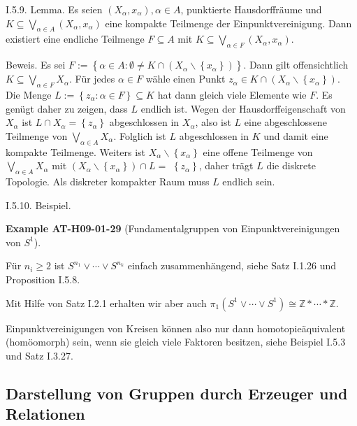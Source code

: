 \documentclass[10pt, letterpaper]{article}
\newcommand{\CustomHeading}[3]{%
  \par\medskip\noindent%
  \textbf{#1 #2} \textnormal{(#3)}.\enskip%
}
\newenvironment{EXA}[2]{\begin{unitbox}\CustomHeading{Example}{#1}{#2}}{\end{unitbox}}
\begin{document}
I.5.9. Lemma. Es seien $\left(X_\alpha, x_\alpha\right), \alpha \in A$, punktierte Hausdorffräume und $K \subseteq \bigvee_{\alpha \in A}\left(X_\alpha, x_\alpha\right)$ eine kompakte Teilmenge der Einpunktvereinigung. Dann existiert eine endliche Teilmenge $F \subseteq A$ mit $K \subseteq \bigvee_{\alpha \in F}\left(X_\alpha, x_\alpha\right)$.

Beweis. Es sei $F:=\left\{\alpha \in A: \emptyset \neq K \cap\left(X_\alpha \backslash\left\{x_\alpha\right\}\right)\right\}$. Dann gilt offensichtlich $K \subseteq \bigvee_{\alpha \in F} X_\alpha$. Für jedes $\alpha \in F$ wähle einen Punkt $z_\alpha \in K \cap\left(X_\alpha \backslash\left\{x_\alpha\right\}\right)$. Die Menge $L:=\left\{z_\alpha: \alpha \in F\right\} \subseteq K$ hat dann gleich viele Elemente wie $F$. Es genügt daher zu zeigen, dass $L$ endlich ist. Wegen der Hausdorffeigenschaft von $X_\alpha$ ist $L \cap X_\alpha=\left\{z_\alpha\right\}$ abgeschlossen in $X_\alpha$, also ist $L$ eine abgeschlossene Teilmenge von $\bigvee_{\alpha \in A} X_\alpha$. Folglich ist $L$ abgeschlossen in $K$ und damit eine kompakte Teilmenge. Weiters ist $X_\alpha \backslash\left\{x_\alpha\right\}$ eine offene Teilmenge von $\bigvee_{\alpha \in A} X_\alpha$ mit $\left(X_\alpha \backslash\left\{x_\alpha\right\}\right) \cap L=$ $\left\{z_\alpha\right\}$, daher trägt $L$ die diskrete Topologie. Als diskreter kompakter Raum muss $L$ endlich sein.



I.5.10. Beispiel. 


\begin{EXA}{AT-H09-01-29}{Fundamentalgruppen von Einpunktvereinigungen von $S^1$}
Für $n_i \geq 2$ ist $S^{n_1} \vee \cdots \vee S^{n_k}$ einfach zusammenhängend, siehe Satz I.1.26 und Proposition I.5.8. 

Mit Hilfe von Satz I.2.1 erhalten wir aber auch $\pi_1\left(S^1 \vee \cdots \vee S^1\right) \cong \mathbb{Z} * \cdots * \mathbb{Z}$. 

Einpunktvereinigungen von Kreisen können also nur dann homotopieäquivalent (homöomorph) sein, wenn sie gleich viele Faktoren besitzen, siehe Beispiel I.5.3 und Satz I.3.27.
\end{EXA}





\pagebreak

\subsection{Darstellung von Gruppen durch Erzeuger und Relationen}
\end{document}
